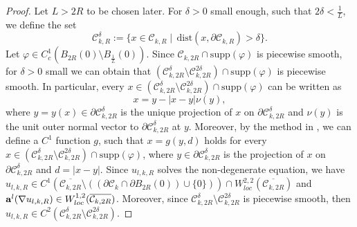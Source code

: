 \documentclass[12pt]{amsart}
\theoremstyle{definition}
\theoremstyle{remark}
\theoremstyle{conclusion}
\theoremstyle{conjecture}
\numberwithin{equation}{section}
\begin{document}
\begin{proof}
\smallskip
Let $L>2R$ to be chosen later. For $\delta>0$ small enough, such that $2\delta<\frac{1}{L}$, we define the set
 \begin{equation*}
    \mathcal{C}_{k,R}^{\delta}:=\{x\in\mathcal{C}_{k,R}\mid\,\text{dist}(x,\partial\mathcal{C}_{k,R})>\delta\}.
 \end{equation*}
Let $\varphi \in C^{1}_c(B_{2R}(0)\setminus B_{\frac{1}{L}}(0))$.  Since $\mathcal{C}_{k,2R}\cap \text{supp}(\varphi)$
 is piecewise smooth, for $\delta>0$ small we can obtain
 that $(\mathcal{C}_{k,2R}^{\delta}\setminus \mathcal{C}_{k,2R}^{2\delta})\cap\text{supp}(\varphi)$ is piecewise smooth. In particular,
 every $x\in(\mathcal{C}_{k,2R}^{\delta}\setminus \mathcal{C}_{k,2R}^{2\delta})\cap\text{supp}(\varphi)$ can be written as
 \begin{equation*}
    x=y-|x-y|\nu(y),
 \end{equation*}
 where $y=y(x)\in\partial\mathcal{C}_{k,2R}^{\delta}$ is the unique projection of $x$ on $\partial\mathcal{C}_{k,2R}^{\delta}$ and $\nu(y)$
 is the unit outer normal vector to $\partial\mathcal{C}_{k,2R}^{\delta}$ at $y$. Moreover, by the method in \cite[Formula (14.98)]{GT}, we can
  define a $C^1$ function $g$, such that $x=g(y,d)$ holds for every
   $x\in(\mathcal{C}_{k,2R}^{\delta}\setminus \mathcal{C}_{k,2R}^{2\delta})\cap\text{supp}(\varphi)$, where $y\in\partial\mathcal{C}_{k,2R}^{\delta}$ is the projection of $x$ on $\partial\mathcal{C}_{k,2R}^{\delta}$ and $d=|x-y|$. Since $u_{l,k,R}$
     solves the non-degenerate equation, we have $u_{l,k,R}\in C^1(\overline{\mathcal{C}_{k,2R}}\setminus((\partial\mathcal{C}_k\cap\partial B_{2R}(0))\cup\{0\}))\cap W^{2,2}_{loc}(\overline{\mathcal{C}_{k,2R}})$ and
     ${\bf{a}}^l(\nabla u_{l,k,R})\in W^{1,2}_{loc}(\overline{\mathcal{C}_{k,2R}})$. Moreover, since
       $\mathcal{C}_{k,2R}^{\delta}\setminus \mathcal{C}_{k,2R}^{2\delta}$ is piecewise smooth, then $u_{l,k,R}\in C^2(\mathcal{C}_{k,2R}^{\delta}\setminus \mathcal{C}_{k,2R}^{2\delta})$.
\smallskip


\end{proof}
\end{document}
